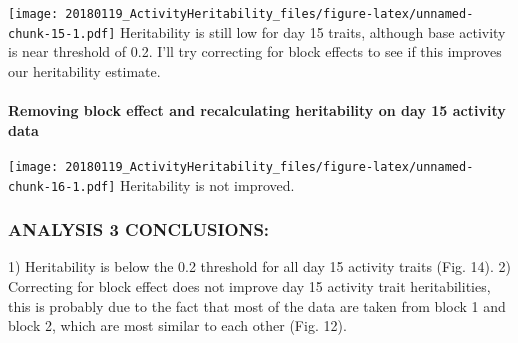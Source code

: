 \documentclass[]{article}
\let\oldparagraph\paragraph
\renewcommand{\paragraph}[1]{\oldparagraph{#1}\mbox{}}
\begin{document}
\texttt{[image: 20180119\_ActivityHeritability\_files/figure-latex/unnamed-chunk-15-1.pdf]}
Heritability is still low for day 15 traits, although base activity is
near threshold of 0.2. I'll try correcting for block effects to see if
this improves our heritability estimate.

\hypertarget{removing-block-effect-and-recalculating-heritability-on-day-15-activity-data}{%
\paragraph{Removing block effect and recalculating heritability on day
15 activity
data}\label{removing-block-effect-and-recalculating-heritability-on-day-15-activity-data}}

\texttt{[image: 20180119\_ActivityHeritability\_files/figure-latex/unnamed-chunk-16-1.pdf]}
Heritability is not improved.

\hypertarget{analysis-3-conclusions}{%
\subsubsection{ANALYSIS 3 CONCLUSIONS:}\label{analysis-3-conclusions}}

 1) Heritability is below the 0.2 threshold for all day 15 activity
traits (Fig. 14). 2) Correcting for block effect does not improve day 15
activity trait heritabilities, this is probably due to the fact that
most of the data are taken from block 1 and block 2, which are most
similar to each other (Fig. 12).
\end{document}
